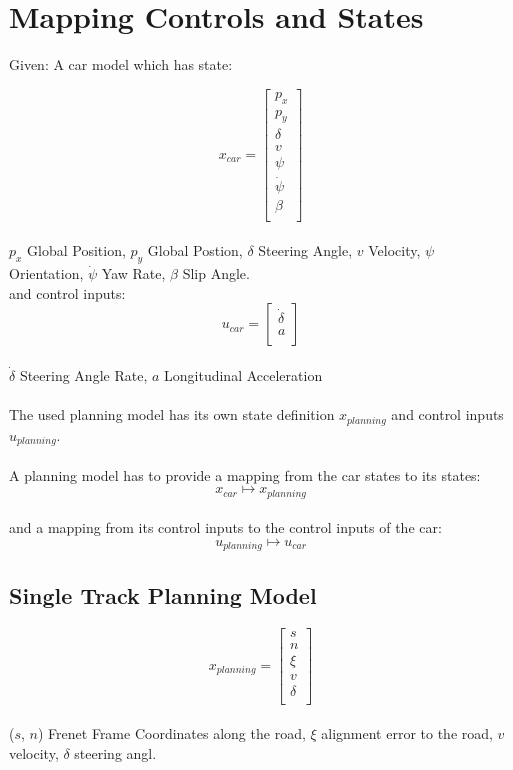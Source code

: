 \chapter{Mapping Controls and States}

Given: A car model which has state:

\[
	x_{car} = \begin{bmatrix}
		p_x        \\
		p_y        \\
		\delta     \\
		v          \\
		\psi       \\
		\dot{\psi} \\
		\beta      \\
	\end{bmatrix}
\]
\\
$p_x$ Global Position, $p_y$ Global Postion, $\delta$ Steering Angle, $v$ Velocity, $\psi$ Orientation, $\dot{\psi}$ Yaw Rate, $\beta$ Slip Angle.
\\
and control inputs:
\[
	u_{car} = \begin{bmatrix}
		\dot{\delta} \\
		a            \\
	\end{bmatrix}
\]
\\
$\dot{\delta}$ Steering Angle Rate, $a$ Longitudinal Acceleration
\\
\\
The used planning model has its own state definition $x_{planning}$ and control inputs $u_{planning}$.
\\
\\
A planning model has to provide a mapping from the car states to its states:
\[
	x_{car}\mapsto x_{planning}
\]
\\
and a mapping from its control inputs to the control inputs of the car:
\[
	u_{planning} \mapsto u_{car}
\]

\section{Single Track Planning Model}

\[
	x_{planning} = \begin{bmatrix}
		s      \\
		n      \\
		\xi    \\
		v      \\
		\delta \\
	\end{bmatrix}
\]
\\
($s$, $n$) Frenet Frame Coordinates along the road, $\xi$ alignment error to the road, $v$ velocity, $\delta$ steering angl.


